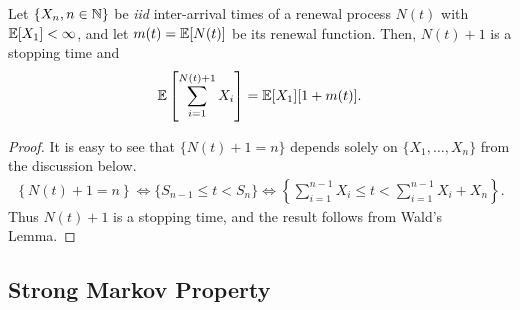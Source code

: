 \documentclass[a4paper,10pt,english]{article}
\begin{document}

\begin{prop} \label{prop:WaldRenewal}
	Let $\{X_n, n \in \mathbb{N}\}$ be \textit{iid} inter-arrival times of a renewal process $N(t)$ with $\mathbb{E}[X_1] < \infty$, and let $m(t) = \mathbb{E}[N(t)]$ be its renewal function. Then, $N(t)+1$ is a stopping time and 
	\begin{align*}
	\mathbb{E}\left[\sum_{i=1}^{N(t)+1}X_i\right] = \mathbb{E}[X_1][1+m(t)].
	\end{align*}
\end{prop}
\begin{proof} It is easy to see that $\{N(t)+1=n\}$ depends solely on $\{X_1,\ldots,X_n\}$ from the discussion below.
	\begin{align*}
	\left\{N(t) + 1 = n \right\} \iff \{S_{n-1} \leq t < S_n\} \iff \left\{\sum_{i=1}^{n-1} X_i \leq t < \sum_{i=1}^{n-1} X_i + X_n\right\}.
	\end{align*}
	Thus $N(t)+1$ is a stopping time, and the result follows from Wald's Lemma.
\end{proof}
\subsection{Strong Markov Property}
\end{document}
